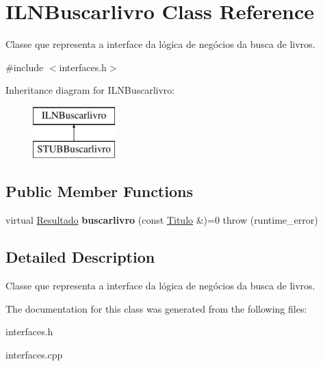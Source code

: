 \hypertarget{classILNBuscarlivro}{}\section{I\+L\+N\+Buscarlivro Class Reference}
\label{classILNBuscarlivro}


Classe que representa a interface da lógica de negócios da busca de livros.  




{\ttfamily \#include $<$interfaces.\+h$>$}

Inheritance diagram for I\+L\+N\+Buscarlivro\+:\begin{figure}[H]
\begin{center}
\leavevmode
\includegraphics[height=2.000000cm]{classILNBuscarlivro}
\end{center}
\end{figure}
\subsection*{Public Member Functions}
\begin{DoxyCompactItemize}
\item 
\mbox{\label{classILNBuscarlivro_ab95f9a9c723c7790f2a879d9379d72cb}} 
virtual \hyperlink{classResultado}{Resultado} {\bfseries buscarlivro} (const \hyperlink{classTitulo}{Titulo} \&)=0  throw (runtime\+\_\+error)
\end{DoxyCompactItemize}


\subsection{Detailed Description}
Classe que representa a interface da lógica de negócios da busca de livros. 

The documentation for this class was generated from the following files\+:\begin{DoxyCompactItemize}
\item 
interfaces.\+h\item 
interfaces.\+cpp\end{DoxyCompactItemize}

